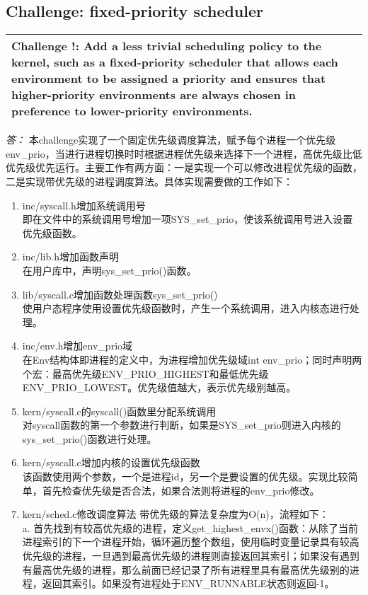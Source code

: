 \documentclass[11pt,a4paper]{article}
\newcommand{\exercise}[2]{
\begin{tabular}{|p{\textwidth}|}
\hline
#1: #2\\
\hline
\end{tabular}
\textit{\large{答：}}}
\begin{document}
\subsection{Challenge: fixed-priority scheduler}
\exercise{Challenge !}{Add a less trivial scheduling policy to the kernel, such as a fixed-priority scheduler that allows each environment to be assigned a priority and ensures that higher-priority environments are always chosen in preference to lower-priority environments.}
本challenge实现了一个固定优先级调度算法，赋予每个进程一个优先级env\_prio，当进行进程切换时时根据进程优先级来选择下一个进程，高优先级比低优先级优先运行。主要工作有两方面：一是实现一个可以修改进程优先级的函数，二是实现带优先级的进程调度算法。具体实现需要做的工作如下：\\
\begin{enumerate}
\item inc/syscall.h增加系统调用号\\
即在文件中的系统调用号增加一项SYS\_set\_prio，使该系统调用号进入设置优先级函数。
\item inc/lib.h增加函数声明\\
在用户库中，声明sys\_set\_prio()函数。
\item lib/syscall.c增加函数处理函数sys\_set\_prio()\\
使用户态程序使用设置优先级函数时，产生一个系统调用，进入内核态进行处理。
\item inc/env.h增加env\_prio域\\
在Env结构体即进程的定义中，为进程增加优先级域int env\_prio；同时声明两个宏：最高优先级ENV\_PRIO\_HIGHEST和最低优先级ENV\_PRIO\_LOWEST。优先级值越大，表示优先级别越高。
\item kern/syscall.c的syscall()函数里分配系统调用\\
对syscall函数的第一个参数进行判断，如果是SYS\_set\_prio则进入内核的sys\_set\_prio()函数进行处理。
\item kern/syscall.c增加内核的设置优先级函数\\
该函数使用两个参数，一个是进程id，另一个是要设置的优先级。实现比较简单，首先检查优先级是否合法，如果合法则将进程的env\_prio修改。
\item kern/sched.c修改调度算法
带优先级的算法复杂度为O(n)，流程如下：\\
a. 首先找到有较高优先级的进程，定义get\_highest\_envx()函数：从除了当前进程索引的下一个进程开始，循环遍历整个数组，使用临时变量记录具有较高优先级的进程，一旦遇到最高优先级的进程则直接返回其索引；如果没有遇到有最高优先级的进程，那么前面已经记录了所有进程里具有最高优先级别的进程，返回其索引。如果没有进程处于ENV\_RUNNABLE状态则返回-1。\\

\end{enumerate}
\end{document}
